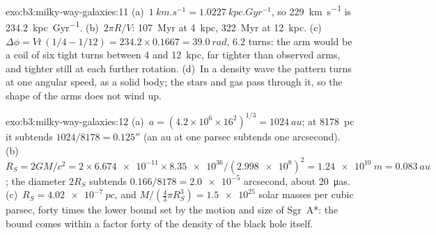 \begin{solution}{exo:b3:milky-way-galaxies:11}
(a)~$\qty{1}{km.s^{-1}} = \qty{1.0227}{kpc.Gyr^{-1}}$, so
\qty{229}{km.s^{-1}} is \qty{234.2}{kpc.Gyr^{-1}}. (b)~$2\pi R/V$:
\qty{107}{Myr} at \qty{4}{kpc}, \qty{322}{Myr} at \qty{12}{kpc}.
(c)~$\Delta\phi = Vt\,(1/4 - 1/12) = 234.2\times0.1667 = \qty{39.0}{rad}$,
6.2 turns: the arm would be a coil of six tight turns between 4 and
\qty{12}{kpc}, far tighter than observed arms, and tighter still at each
further rotation. (d)~In a density wave the pattern turns at one angular
speed, as a solid body; the stars and gas pass through it, so the shape
of the arms does not wind up.
\end{solution}

\begin{solution}{exo:b3:milky-way-galaxies:12}
(a)~$a = (4.2\times10^6\times16^2)^{1/3} = \qty{1024}{au}$; at
\qty{8178}{pc} it subtends $1024/8178 = \ang{;;0.125}$ (an au at one parsec
subtends one arcsecond). (b)~$R_S = 2GM/c^2 = 2\times\num{6.674e-11}
\times\num{8.35e36}/(\num{2.998e8})^2 = \qty{1.24e10}{m} = \qty{0.083}{au}$;
the diameter $2R_S$ subtends $0.166/8178 = \num{2.0e-5}$ arcsecond, about
\qty{20}{\micro as}. (c)~$R_S = \qty{4.02e-7}{pc}$, and $M/(\tfrac43\pi
R_S^3) = \num{1.5e25}$ solar masses per cubic parsec, forty times the
lower bound set by the motion and size of Sgr~A*: the bound comes within
a factor forty of the density of the black hole itself.
\end{solution}

